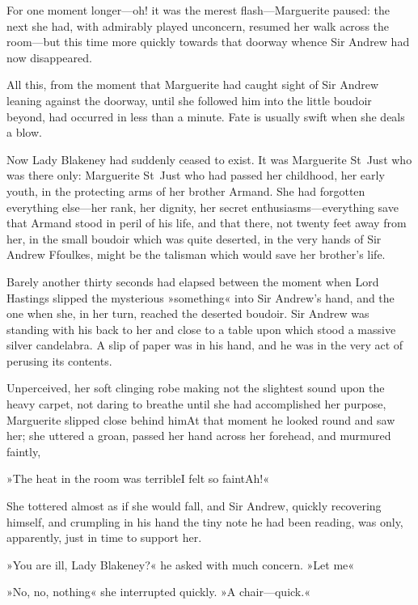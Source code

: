 For one moment longer—oh! it was the merest flash—Marguerite paused: the next she had, with admirably played unconcern, resumed her walk across the room—but this time more quickly towards that doorway whence Sir Andrew had now disappeared.

All this, from the moment that Marguerite had caught sight of Sir Andrew leaning against the doorway, until she followed him into the little boudoir beyond, had occurred in less than a minute. Fate is usually swift when she deals a blow.

Now Lady Blakeney had suddenly ceased to exist. It was Marguerite St~Just who was there only: Marguerite St~Just who had passed her childhood, her early youth, in the protecting arms of her brother Armand. She had forgotten everything else—her rank, her dignity, her secret enthusiasms—everything save that Armand stood in peril of his life, and that there, not twenty feet away from her, in the small boudoir which was quite deserted, in the very hands of Sir Andrew Ffoulkes, might be the talisman which would save her brother's life.

Barely another thirty seconds had elapsed between the moment when Lord Hastings slipped the mysterious »something« into Sir Andrew's hand, and the one when she, in her turn, reached the deserted boudoir. Sir Andrew was standing with his back to her and close to a table upon which stood a massive silver candelabra. A slip of paper was in his hand, and he was in the very act of perusing its contents.

Unperceived, her soft clinging robe making not the slightest sound upon the heavy carpet, not daring to breathe until she had accomplished her purpose, Marguerite slipped close behind him\textellipsis \allowbreak  At that moment he looked round and saw her; she uttered a groan, passed her hand across her forehead, and murmured faintly,\longdash


»The heat in the room was terrible\textellipsis \allowbreak  I felt so faint\textellipsis \allowbreak  Ah!\textellipsis«

She tottered almost as if she would fall, and Sir Andrew, quickly recovering himself, and crumpling in his hand the tiny note he had been reading, was only, apparently, just in time to support her.

»You are ill, Lady Blakeney?« he asked with much concern. »Let me\textellipsis«

»No, no, nothing\longdash« she interrupted quickly. »A chair—quick.«

